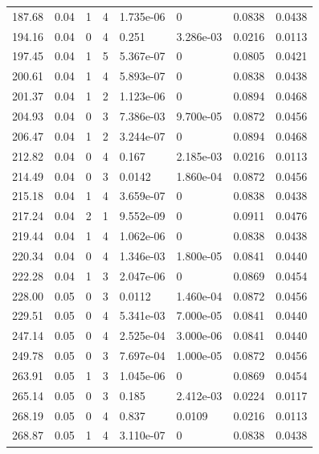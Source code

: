 \documentclass[preview]{standalone}
\begin{document}
{{{\begin{tabular}{L{1.2cm}C{1.2cm} C{0.3cm}C{0.5cm} C{1.4cm}C{1.4cm} C{1.4cm}C{1.4cm}}
  187.68  &  0.04  & 1     &  4 &  1.735e-06  & 0  & 0.0838 &  0.0438   \\ 
  194.16  &  0.04  & 0     &  4 &  0.251  & 3.286e-03  & 0.0216 &  0.0113   \\ 
  197.45  &  0.04  & 1     &  5 &  5.367e-07  & 0  & 0.0805 &  0.0421   \\ 
  200.61  &  0.04  & 1     &  4 &  5.893e-07  & 0  & 0.0838 &  0.0438   \\ 
  201.37  &  0.04  & 1     &  2 &  1.123e-06  & 0  & 0.0894 &  0.0468   \\ 
  204.93  &  0.04  & 0     &  3 &  7.386e-03  & 9.700e-05  & 0.0872 &  0.0456   \\ 
  206.47  &  0.04  & 1     &  2 &  3.244e-07  & 0  & 0.0894 &  0.0468   \\ 
  212.82  &  0.04  & 0     &  4 &  0.167  & 2.185e-03  & 0.0216 &  0.0113   \\ 
  214.49  &  0.04  & 0     &  3 &  0.0142  & 1.860e-04  & 0.0872 &  0.0456   \\ 
  215.18  &  0.04  & 1     &  4 &  3.659e-07  & 0  & 0.0838 &  0.0438   \\ 
  217.24  &  0.04  & 2     &  1 &  9.552e-09  & 0  & 0.0911 &  0.0476   \\ 
  219.44  &  0.04  & 1     &  4 &  1.062e-06  & 0  & 0.0838 &  0.0438   \\ 
  220.34  &  0.04  & 0     &  4 &  1.346e-03  & 1.800e-05  & 0.0841 &  0.0440   \\ 
  222.28  &  0.04  & 1     &  3 &  2.047e-06  & 0  & 0.0869 &  0.0454   \\ 
  228.00  &  0.05  & 0     &  3 &  0.0112  & 1.460e-04  & 0.0872 &  0.0456   \\ 
  229.51  &  0.05  & 0     &  4 &  5.341e-03  & 7.000e-05  & 0.0841 &  0.0440   \\ 
  247.14  &  0.05  & 0     &  4 &  2.525e-04  & 3.000e-06  & 0.0841 &  0.0440   \\ 
  249.78  &  0.05  & 0     &  3 &  7.697e-04  & 1.000e-05  & 0.0872 &  0.0456   \\ 
  263.91  &  0.05  & 1     &  3 &  1.045e-06  & 0  & 0.0869 &  0.0454   \\ 
  265.14  &  0.05  & 0     &  3 &  0.185  & 2.412e-03  & 0.0224 &  0.0117   \\ 
  268.19  &  0.05  & 0     &  4 &  0.837  & 0.0109  & 0.0216 &  0.0113   \\ 
  268.87  &  0.05  & 1     &  4 &  3.110e-07  & 0  & 0.0838 &  0.0438   \\ 

\end{tabular}}}}
\end{document}
